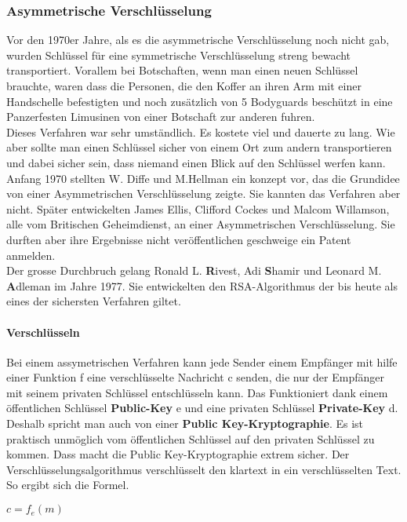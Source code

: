 \subsubsection{Asymmetrische Verschlüsselung}
Vor den 1970er Jahre, als es die asymmetrische Verschlüsselung noch nicht gab, wurden Schlüssel für eine symmetrische Verschlüsselung streng bewacht transportiert.
Vorallem bei Botschaften, wenn man einen neuen Schlüssel brauchte, waren dass die Personen, die den Koffer an ihren Arm mit einer Handschelle befestigten und noch zusätzlich von 5 Bodyguards beschützt in eine Panzerfesten Limusinen von einer Botschaft zur anderen fuhren.\\
Dieses Verfahren war sehr umständlich. Es kostete viel und dauerte zu lang. Wie aber sollte man einen Schlüssel sicher von einem Ort zum andern transportieren und dabei sicher sein, dass niemand einen Blick auf den Schlüssel werfen kann.\\
Anfang 1970 stellten W. Diffe und M.Hellman ein konzept vor, das die Grundidee von einer Asymmetrischen Verschlüsselung zeigte. Sie kannten das Verfahren aber nicht.
Später entwickelten James Ellis, Clifford Cockes und Malcom Willamson, alle vom Britischen Geheimdienst, an einer Asymmetrischen Verschlüsselung. Sie durften aber ihre Ergebnisse nicht veröffentlichen geschweige ein Patent anmelden.\\
Der grosse Durchbruch gelang Ronald L. \textbf{R}ivest, Adi \textbf{S}hamir und Leonard M. \textbf{A}dleman im Jahre 1977. Sie entwickelten den RSA-Algorithmus der bis heute als eines der sichersten Verfahren giltet.\\[2ex]
%
\paragraph{Verschlüsseln}
Bei einem assymetrischen Verfahren kann jede Sender einem Empfänger mit hilfe einer Funktion f eine verschlüsselte Nachricht c senden, die nur der Empfänger mit seinem privaten Schlüssel entschlüsseln kann. Das Funktioniert dank einem öffentlichen Schlüssel \textbf{Public-Key} e und eine privaten Schlüssel \textbf{Private-Key} d. \\
Deshalb spricht man auch von einer  \textbf{Public Key-Kryptographie}. Es ist praktisch unmöglich vom öffentlichen Schlüssel auf den privaten Schlüssel zu kommen. Dass macht die Public Key-Kryptographie extrem sicher. 
Der Verschlüsselungsalgorithmus verschlüsselt den klartext in ein verschlüsselten Text. So ergibt sich die Formel.
\begin{center}
$ c = f_e (m) $
\end{center}
